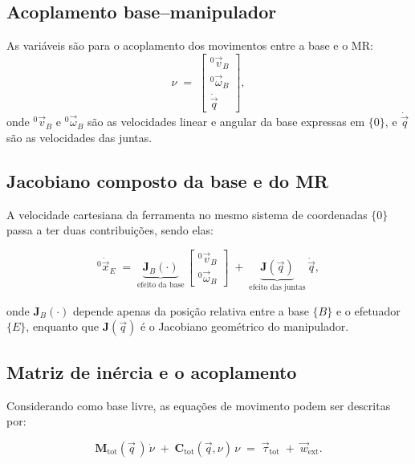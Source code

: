 \subsection{Acoplamento base--manipulador}
\label{sec:acoplamento_base_manipulador}

As variáveis são para o acoplamento dos movimentos entre a base e o MR:
\begin{equation}
\label{eq:nu_def}
\nu
\;=\;
\begin{bmatrix}
{}^{0}\!\vec v_{B} \\[2pt]
{}^{0}\!\vec \omega_{B} \\[2pt]
\dot{\vec q}
\end{bmatrix},
\end{equation}
onde ${}^{0}\!\vec v_{B}$ e
${}^{0}\!\vec \omega_{B}$
são as velocidades linear e angular da base expressas em $\{0\}$, e
$\dot{\vec q}$ são as velocidades das juntas.

\subsection{Jacobiano composto da base e do MR}
A velocidade cartesiana da ferramenta no mesmo sistema de coordenadas $\{0\}$ passa a ter duas contribuições, sendo elas:

\begin{equation}
\label{eq:xdot_composto}
{}^{0}\!\dot{\vec x}_{E}
\;=\;
\underbrace{\mathbf{J}_{\!B}(\cdot)}_{\text{efeito da base}}\,
\begin{bmatrix}
{}^{0}\!\vec v_{B} \\
{}^{0}\!\vec \omega_{B}
\end{bmatrix}
\;+\;
\underbrace{\mathbf{J}(\vec q)}_{\text{efeito das juntas}}\,\dot{\vec q},
\end{equation}

onde $\mathbf{J}_{\!B}(\cdot)$ depende apenas da posição relativa entre a base $\{B\}$ e
o efetuador $\{E\}$, enquanto que
$\mathbf{J}(\vec q)$ é o Jacobiano geométrico do manipulador.

\subsection{Matriz de inércia e o acoplamento}
Considerando como base livre, as equações de movimento podem ser descritas por:

\begin{equation}
\label{eq:EOM_particionada_compacta}
\mathbf M_{\text{tot}}(\vec q\, )\,\dot{\nu}
\;+\;
\mathbf C_{\text{tot}}(\vec q,\nu)\,\nu
\;=\;
\vec\tau_{\text{tot}}
\;+\;
\vec w_{\text{ext}}.
\end{equation}

